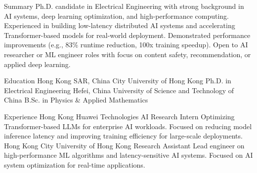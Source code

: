 \documentclass[caps, english]{financecv}
\begin{document}
\begin{cvsection}{Summary}
    Ph.D. candidate in Electrical Engineering with strong background in AI systems, deep learning optimization, and high-performance computing. Experienced in building low-latency distributed AI systems and accelerating Transformer-based models for real-world deployment. Demonstrated performance improvements (e.g., 83\% runtime reduction, 100x training speedup). Open to AI researcher or ML engineer roles with focus on content safety, recommendation, or applied deep learning.
\end{cvsection}

\begin{cvsection}{Education}
    {Hong Kong SAR, China}
    {City University of Hong Kong}
    {Ph.D. in Electrical Engineering}
    {}
    {}
    {}
    {}
    {Hefei, China}
    {University of Science and Technology of China}
    {B.Sc. in Physics \& Applied Mathematics}
    {}
    {}
    {}
    {}
\end{cvsection}

\begin{cvsection}{Experience}
    {Hong Kong}
    {Huawei Technologies}
    {AI Research Intern}
    {Optimizing Transformer-based LLMs for enterprise AI workloads. Focused on reducing model inference latency and improving training efficiency for large-scale deployments.}
    {}
    {}
    {}
    {Hong Kong}
    {City University of Hong Kong}
    {Research Assistant}
    {Lead engineer on high-performance ML algorithms and latency-sensitive AI systems. Focused on AI system optimization for real-time applications.}
    {}
    {}
    {}
\end{cvsection}
\end{document}
